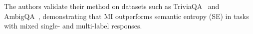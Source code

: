 

The authors validate their method on datasets such as TriviaQA~\cite{triviaqa} and AmbigQA~\cite{ambigqa}, demonstrating that MI outperforms semantic entropy (SE) in tasks with mixed single- and multi-label responses. 





